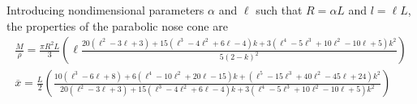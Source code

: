\documentclass[11pt,dvipsnames]{thesis}
\begin{document}
Introducing nondimensional parameters $\alpha$ and $\ell$ such that $R = \alpha L$ and $l = \ell L$, the properties of the parabolic nose cone are
\begin{gather}
\frac{M}{\rho} = \frac{\pi R^2 L}{3} \left(\ell \frac{20(\ell^2 - 3\ell + 3) + 15(\ell^3 - 4\ell^2 + 6\ell - 4)k + 3(\ell^4 - 5\ell^3 + 10\ell^2 - 10\ell + 5)k^2}{5(2 - k)^2}\right) \\
\overline{x} = \frac{L}{2} \left(\frac{10(\ell^3 - 6\ell + 8) + 6(\ell^4 - 10\ell^2 + 20\ell - 15)k + (\ell^5 - 15\ell^3 + 40\ell^2 -45\ell + 24)k^2}{20(\ell^2 - 3\ell + 3) + 15(\ell^3 - 4\ell^2 + 6\ell -4)k + 3(\ell^4 - 5\ell^3 + 10\ell^2 - 10\ell + 5)k^2}\right) \label{eq:StructuresParabolicCOM}
\end{gather}
\end{document}
